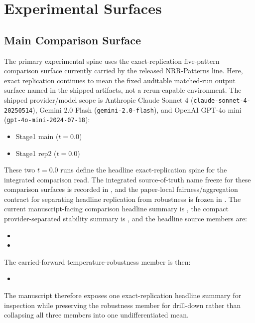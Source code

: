 \documentclass[11pt,a4paper]{article}
\begin{document}
\section{Experimental Surfaces}
\label{sec:surfaces}

\subsection{Main Comparison Surface}

The primary experimental spine uses the exact-replication five-pattern comparison surface currently carried by the released NRR-Patterns line. Here, exact replication continues to mean the fixed auditable matched-run output surface named in the shipped artifacts, not a rerun-capable environment. The shipped provider/model scope is Anthropic Claude Sonnet 4 (\texttt{claude-sonnet-4-20250514}), Gemini 2.0 Flash (\texttt{gemini-2.0-flash}), and OpenAI GPT-4o mini (\texttt{gpt-4o-mini-2024-07-18}):
\begin{itemize}
  \item Stage1 main (\(t=0.0\))
  \item Stage1 rep2 (\(t=0.0\))
\end{itemize}

These two \(t=0.0\) runs define the headline exact-replication spine for the integrated comparison read. The integrated source-of-truth name freeze for these comparison surfaces is recorded in , and the paper-local fairness/aggregation contract for separating headline replication from robustness is frozen in . The current manuscript-facing comparison headline summary is , the compact provider-separated stability summary is , and the headline source members are:
\begin{itemize}
  \item {}
  \item {}
\end{itemize}
The carried-forward temperature-robustness member is then:
\begin{itemize}
  \item {}
\end{itemize}
The manuscript therefore exposes one exact-replication headline summary for inspection while preserving the robustness member for drill-down rather than collapsing all three members into one undifferentiated mean.
\end{document}
